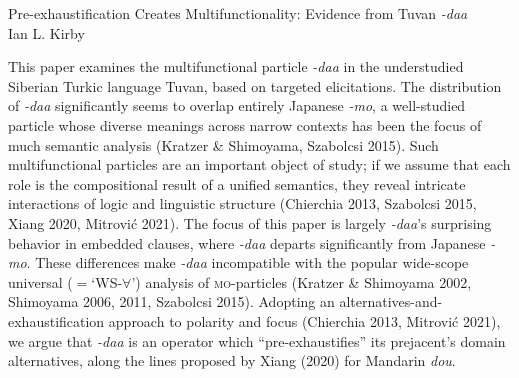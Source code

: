 \documentclass[11pt]{article}
\title{}
\author{}
\date{December 2021}
\begin{document}


\begin{center}
    {Pre-exhaustification Creates Multifunctionality: Evidence from Tuvan \textit{-daa}}\\
    Ian L. Kirby
\end{center}

\vspace{-8pt}

This paper examines the multifunctional particle \textit{-daa} in the understudied Siberian Turkic language Tuvan, based on targeted elicitations. The distribution of \textit{-daa} significantly seems to overlap entirely Japanese \textit{-mo}, a well-studied particle whose diverse meanings across narrow contexts has been the focus of much semantic analysis (Kratzer \& Shimoyama, Szabolcsi 2015).  Such multifunctional particles are an important object of study; if we assume that each role is the compositional result of a unified semantics, they reveal intricate interactions of logic and linguistic structure (Chierchia 2013, Szabolcsi 2015, Xiang 2020, Mitrovi\'{c} 2021).  The focus of this paper is largely \textit{-daa}'s surprising behavior in embedded clauses, where \textit{-daa} departs significantly from Japanese \textit{-mo}. These differences make \textit{-daa} incompatible with the popular wide-scope universal ($=$`WS-$\forall$') analysis of \textsc{mo}-particles (Kratzer \& Shimoyama 2002, Shimoyama 2006, 2011, Szabolcsi 2015).  Adopting an alternatives-and-exhaustification approach to polarity and focus (Chierchia 2013, Mitrovi\'{c} 2021), we argue that \textit{-daa} is an operator which ``pre-exhaustifies'' its prejacent's domain alternatives, along the lines proposed by Xiang (2020) for Mandarin \textit{dou}.
\end{document}

